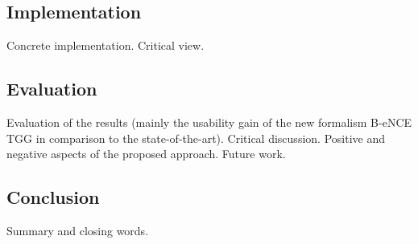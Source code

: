 \documentclass[]{article}
\begin{document}
\subsection*{Implementation}
Concrete implementation. Critical view.

\subsection*{Evaluation}
Evaluation of the results (mainly the usability gain of the new formalism B-eNCE TGG in comparison to the state-of-the-art). Critical discussion. Positive and negative aspects of the proposed approach. Future work.

\subsection*{Conclusion}
Summary and closing words.

%
%
\end{document}
